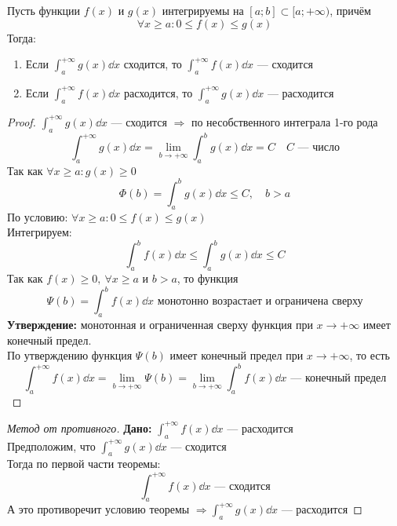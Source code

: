 \begin{theorem}
    Пусть функции $f(x)$ и $g(x)$ интегрируемы на $[a;b]\subset [a; +\infty)$, причём \[ \forall x \geqslant a\colon 0 \leqslant f(x) \leqslant g(x) \] Тогда:
    \begin{enumerate}
        \item Если $\int_{a}^{+\infty} g(x)\dd{x}$ сходится, то $\int_{a}^{+\infty} f(x)\dd{x}$ --- сходится
        \item Если $\int_{a}^{+\infty} f(x)\dd{x}$ расходится, то $\int_{a}^{+\infty} g(x)\dd{x}$ --- расходится
    \end{enumerate}
\end{theorem}
\begin{proof}
    $\int_{a}^{+\infty} g(x)\dd{x}$ --- сходится $\Rightarrow$ по  несобственного интеграла 1-го рода
    \[
        \int_{a}^{+\infty} g(x)\dd{x} = \lim\limits_{b \to +\infty} \int_{a}^{b} g(x)\dd{x} = C\quad C \text{ --- число}
    \]
    Так как $\forall x \geqslant a\colon g(x) \geqslant 0$
    \[
        \Phi (b) = \int_{a}^{b} g(x)\dd{x} \leqslant C,\quad b > a
    \]
    По условию: $\forall x \geqslant a\colon 0 \leqslant f(x) \leqslant g(x)$\\
    Интегрируем:
    \[
        \int_{a}^{b} f(x)\dd{x} \leqslant \int_{a}^{b} g(x)\dd{x} \leqslant C
    \]
    Так как $f(x) \geqslant 0,\ \forall x \geqslant a$ и $b > a$, то функция
    \[
        \Psi (b) = \int_{a}^{b} f(x)\dd{x} \text{ монотонно возрастает и ограничена сверху}
    \]
    \textbf{Утверждение:} монотонная и ограниченная сверху функция при $x \to +\infty$ имеет конечный предел.\\
    По утверждению функция $\Psi(b)$ имеет конечный предел при $x\to +\infty$, то есть
    \[
        \int_{a}^{+\infty} f(x)\dd{x} = \lim\limits_{b \to +\infty}  \Psi(b) = \lim\limits_{b \to +\infty} \int_{a}^{b}f(x)\dd{x} \text{ --- конечный предел}
    \]
\end{proof}
\begin{proof}[Метод от противного]
    \textbf{Дано:} $\int_{a}^{+\infty}f(x)\dd{x}$ --- расходится\\
    Предположим, что $\int_{a}^{+\infty}g(x)\dd{x}$ --- сходится\\
    Тогда по первой части теоремы: \vspace{-0.5\topsep}
    \[
        \int_{a}^{+\infty} f(x)\dd{x} \text{ --- сходится} 
    \]
    А это противоречит условию теоремы $\Rightarrow \int_{a}^{+\infty} g(x)\dd{x}$ --- расходится
\end{proof}

